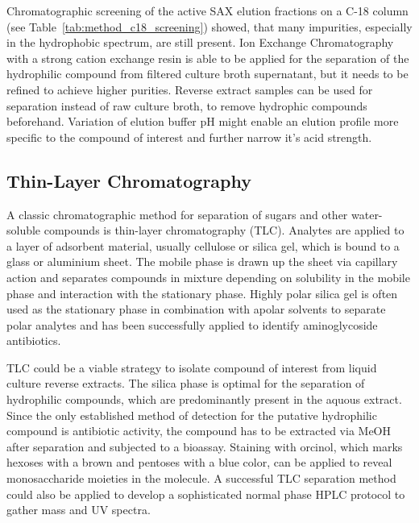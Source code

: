 Chromatographic screening of the active SAX elution fractions on a C-18 column (see Table~\ref{tab:method_c18_screening}) showed, that many impurities, especially in the hydrophobic spectrum, are still present.
Ion Exchange Chromatography with a strong cation exchange resin is able to be applied for the separation of the hydrophilic compound from filtered culture broth supernatant, but it needs to be refined to achieve higher purities.
Reverse extract samples can be used for separation instead of raw culture broth, to remove hydrophic compounds beforehand.
Variation of elution buffer pH might enable an elution profile more specific to the compound of interest and further narrow it's acid strength.



\subsection{Thin-Layer Chromatography} %
\label{sub:results_thin_layer_chromatography}


A classic chromatographic method for separation of sugars and other water-soluble compounds is thin-layer chromatography (TLC).
Analytes are applied to a layer of adsorbent material, usually cellulose or silica gel, which is bound to a glass or aluminium sheet.
The mobile phase is drawn up the sheet via capillary action and separates compounds in mixture depending on solubility in the mobile phase and interaction with the stationary phase.
Highly polar silica gel is often used as the stationary phase in combination with apolar solvents to separate polar analytes and has been successfully applied to identify aminoglycoside antibiotics.\autocite{Pauncz1980}

TLC could be a viable strategy to isolate compound of interest from liquid culture reverse extracts.
The silica phase is optimal for the separation of hydrophilic compounds, which are predominantly present in the aquous extract.
Since the only established method of detection for the putative hydrophilic compound is antibiotic activity, the compound has to be extracted via MeOH after separation and subjected to a bioassay.
Staining with orcinol, which marks hexoses with a brown and pentoses with a blue color, can be applied to reveal monosaccharide moieties in the molecule.\autocite{ENDO1970}
A successful TLC separation method could also be applied to develop a sophisticated normal phase HPLC protocol to gather mass and UV spectra.

